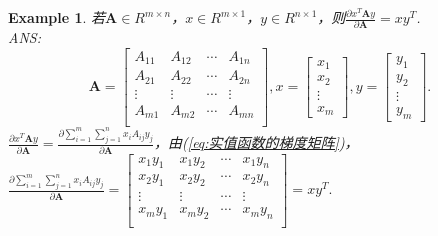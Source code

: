 \documentclass[UTF8,12pt]{ctexart}
\numberwithin{equation}{section}%
\newtheorem{example}{Example}[section]
\begin{document}
		\begin{example}
			若$\bm{A}\in R^{m\times n}$，$x\in R^{m\times 1}$，$y\in R^{n\times 1}$，则$\frac{\partial x^T\bm{A}y }{\partial \bm{A}}=xy^T$.
			\\\indent ANS:\\\indent
			$$\bm{A}=
			\begin{bmatrix}
				A_{11}	&A_{12} & \cdots & A_{1n} \\
				A_{21}	&A_{22} & \cdots & A_{2n} \\
				\vdots& \vdots & \cdots & \vdots\\
				A_{m1}	&A_{m2}  & \cdots &A_{mn} \\
			\end{bmatrix},
			x=\begin{bmatrix}
				x_1\\
				x_2\\
				\vdots\\
				x_m
			\end{bmatrix},
			y=\begin{bmatrix}
				y_1\\
				y_2\\
				\vdots\\
				y_m
			\end{bmatrix}.
			$$
		\indent	$\frac{\partial x^T\bm{A}y }{\partial \bm{A}}=\frac{\partial \sum_{i=1}^{m}\sum_{j=1}^{n}x_iA_{ij}y_j }{\partial \bm{A}}$，由(\ref{eq:实值函数的梯度矩阵})，$\frac{\partial \sum_{i=1}^{m}\sum_{j=1}^{n}x_iA_{ij}y_j }{\partial \bm{A}}=
			\begin{bmatrix}
			x_1y_1	&x_1y_2 & \cdots & x_1y_n \\
			x_2y_1	&x_2y_2 & \cdots & x_2y_n \\
			\vdots& \vdots & \cdots & \vdots\\
			x_my_1	&x_my_2  & \cdots &x_my_n \\
		\end{bmatrix}=xy^T.
		$
		\end{example}

	
\end{document}
